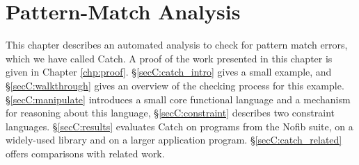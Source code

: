 
\begin{comment}
\h{#*}\begin{code}
import Prelude hiding (map, (||))
import Data.Array
import Data.Maybe
import System.Environment
import Data.Char
import Data.List hiding (map)

infixr 2  ||

data Expr = EVar String
          | ECon String [Expr]
          | EFun String [Expr]
          | EApp Expr [Expr]
          | ELam String Expr
          | ELet String Expr Expr
          | ECase Expr [Alt]

data Alt = EAlt String [String] Expr

type FuncName = String
type CtorName = String
type VarName = String

body   :: FuncName  -> Expr
args   :: FuncName  -> [VarName]
rhs    :: Alt       -> Expr
arity  :: String    -> Int
ctors  :: CtorName  -> [CtorName]

ellipses :: a

instance Eq a => Eq (Prop a)
\end{code}
\h{#mp}\begin{code}
instance Eq Val
\end{code}
\end{comment}


\newcommand{\rec}[1]{\hspace{-0.75ex}_{#1}}


\newcommand{\para}[1]{\vspace{2mm}\noindent\textbf{#1}}


\chapter{Pattern-Match Analysis}
\label{chp:catch}

This chapter describes an automated analysis to check for pattern match errors, which we have called Catch. A proof of the work presented in this chapter is given in Chapter \ref{chp:proof}. \S\ref{secC:catch_intro} gives a small example, and \S\ref{secC:walkthrough} gives an overview of the checking process for this example. \S\ref{secC:manipulate} introduces a small core functional language and a mechanism for reasoning about this language, \S\ref{secC:constraint} describes two constraint languages. \S\ref{secC:results} evaluates Catch on programs from the Nofib suite, on a widely-used library and on a larger application program. \S\ref{secC:catch_related} offers comparisons with related work.


